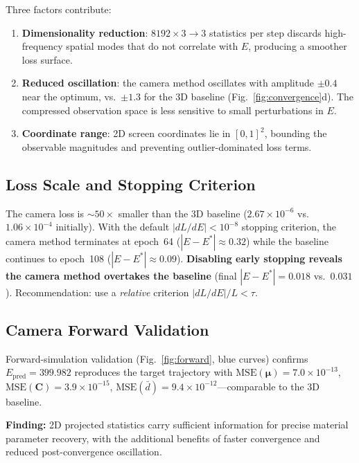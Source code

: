 \documentclass{article}
\begin{document}
Three factors contribute:
\begin{enumerate}[itemsep=1pt]
\item \textbf{Dimensionality reduction}: $8192\times3\to3$ statistics per
  step discards high-frequency spatial modes that do not correlate with
  $E$, producing a smoother loss surface.
\item \textbf{Reduced oscillation}: the camera method oscillates with
  amplitude $\pm0.4$ near the optimum, vs.\ $\pm1.3$ for the 3D baseline
  (Fig.~\ref{fig:convergence}d).  The compressed observation space is less
  sensitive to small perturbations in $E$.
\item \textbf{Coordinate range}: 2D screen coordinates lie in $[0,1]^2$,
  bounding the observable magnitudes and preventing outlier-dominated
  loss terms.
\end{enumerate}

\subsection{Loss Scale and Stopping Criterion}

The camera loss is $\sim\!50\times$ smaller than the 3D baseline
($2.67\times10^{-6}$ vs.\ $1.06\times10^{-4}$ initially).  With the default
$|dL/dE|<10^{-8}$ stopping criterion, the camera method terminates at
epoch~64 ($|E-E^*|\approx0.32$) while the baseline continues to epoch~108
($|E-E^*|\approx0.09$).  \textbf{Disabling early stopping reveals the
camera method overtakes the baseline} (final $|E-E^*|=0.018$ vs.\ $0.031$).
Recommendation: use a \emph{relative} criterion $|dL/dE|/L<\tau$.

\subsection{Camera Forward Validation}

Forward-simulation validation (Fig.~\ref{fig:forward}, blue curves) confirms
$E_{\text{pred}}=399.982$ reproduces the target trajectory with
$\text{MSE}(\boldsymbol{\mu})=7.0\times10^{-13}$,
$\text{MSE}(\mathbf{C})=3.9\times10^{-15}$,
$\text{MSE}(\bar{d})=9.4\times10^{-12}$---comparable to the 3D baseline.

\textbf{Finding:} 2D projected statistics carry sufficient information for
precise material parameter recovery, with the additional benefits of faster
convergence and reduced post-convergence oscillation.


\end{document}
